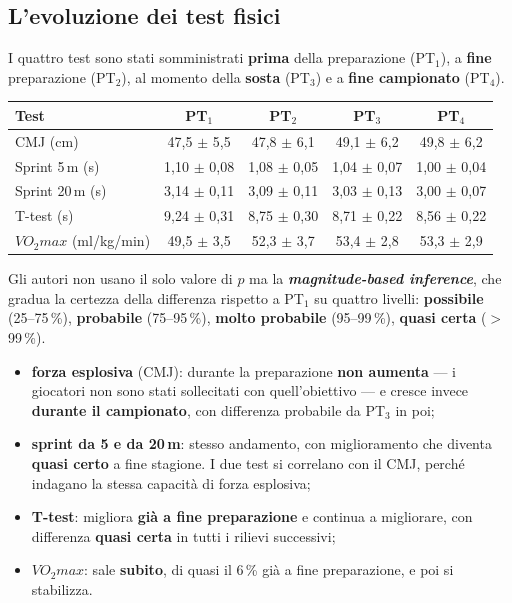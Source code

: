 \subsection{L'evoluzione dei test fisici}

I quattro test sono stati somministrati \textbf{prima} della preparazione (PT$_1$), a
\textbf{fine} preparazione (PT$_2$), al momento della \textbf{sosta} (PT$_3$) e a
\textbf{fine campionato} (PT$_4$).

\begin{table}[htbp]
  \centering
  \small
  \renewcommand{\arraystretch}{1.3}
  \begin{tabularx}{\textwidth}{|X|c|c|c|c|}
    \hline
    \textbf{Test} & \textbf{PT$_1$} & \textbf{PT$_2$} & \textbf{PT$_3$} & \textbf{PT$_4$} \\
    \hline
    CMJ (cm) & 47,5 $\pm$ 5,5 & 47,8 $\pm$ 6,1 & 49,1 $\pm$ 6,2 & 49,8 $\pm$ 6,2 \\
    \hline
    Sprint 5\,m (s) & 1,10 $\pm$ 0,08 & 1,08 $\pm$ 0,05 & 1,04 $\pm$ 0,07 & 1,00 $\pm$ 0,04 \\
    \hline
    Sprint 20\,m (s) & 3,14 $\pm$ 0,11 & 3,09 $\pm$ 0,11 & 3,03 $\pm$ 0,13 & 3,00 $\pm$ 0,07 \\
    \hline
    T-test (s) & 9,24 $\pm$ 0,31 & 8,75 $\pm$ 0,30 & 8,71 $\pm$ 0,22 & 8,56 $\pm$ 0,22 \\
    \hline
    $VO_2max$ (ml/kg/min) & 49,5 $\pm$ 3,5 & 52,3 $\pm$ 3,7 & 53,4 $\pm$ 2,8 & 53,3 $\pm$ 2,9 \\
    \hline
  \end{tabularx}
\end{table}

Gli autori non usano il solo valore di $p$ ma la \textbf{\textit{magnitude-based inference}}, che
gradua la certezza della differenza rispetto a PT$_1$ su quattro livelli: \textbf{possibile}
(25--75\,\%), \textbf{probabile} (75--95\,\%), \textbf{molto probabile} (95--99\,\%),
\textbf{quasi certa} ($>$99\,\%).

\begin{itemize}
  \item \textbf{forza esplosiva} (CMJ): durante la preparazione \textbf{non aumenta} --- i
    giocatori non sono stati sollecitati con quell'obiettivo --- e cresce invece
    \textbf{durante il campionato}, con differenza probabile da PT$_3$ in poi;
  \item \textbf{sprint da 5 e da 20\,m}: stesso andamento, con miglioramento che diventa
    \textbf{quasi certo} a fine stagione. I due test si correlano con il CMJ, perché indagano la
    stessa capacità di forza esplosiva;
  \item \textbf{T-test}: migliora \textbf{già a fine preparazione} e continua a migliorare, con
    differenza \textbf{quasi certa} in tutti i rilievi successivi;
  \item \textbf{$VO_2max$}: sale \textbf{subito}, di quasi il 6\,\% già a fine preparazione, e poi
    si stabilizza.
\end{itemize}

